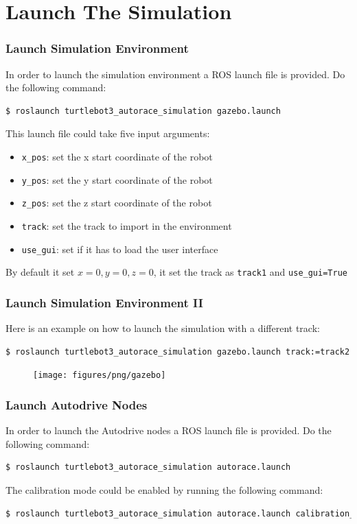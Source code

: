 \section{Launch The Simulation}

\begin{frame}[fragile]
	\frametitle{Launch Simulation Environment}
	In order to launch the simulation environment a ROS launch file is provided. Do the following command:
\begin{lstlisting}[language=bash]
$ roslaunch turtlebot3_autorace_simulation gazebo.launch
\end{lstlisting}

This launch file could take five input arguments:
\begin{itemize}
	\item \texttt{x\_pos}: set the x start coordinate of the robot
	\item \texttt{y\_pos}: set the y start coordinate of the robot
	\item \texttt{z\_pos}: set the z start coordinate of the robot
	\item \texttt{track}: set the track to import in the environment
	\item \texttt{use\_gui}: set if it has to load the user interface
\end{itemize}
By default it set $x = 0, y = 0, z = 0$, it set the track as \texttt{track1} and \texttt{use\_gui=True}
\end{frame}

\begin{frame}[fragile]
\frametitle{Launch Simulation Environment II}
Here is an example on how to launch the simulation with a different track:
\begin{lstlisting}[language=bash]
$ roslaunch turtlebot3_autorace_simulation gazebo.launch track:=track2
\end{lstlisting}
\begin{figure}
	\texttt{[image: figures/png/gazebo]}
\end{figure}
\end{frame}

\begin{frame}[fragile]
	\frametitle{Launch Autodrive Nodes}
	In order to launch the Autodrive nodes a ROS launch file is provided. Do the following command:
\begin{lstlisting}[language=bash]
$ roslaunch turtlebot3_autorace_simulation autorace.launch
\end{lstlisting}

The calibration mode could be enabled by running the following command:
\begin{lstlisting}[language=bash]
$ roslaunch turtlebot3_autorace_simulation autorace.launch calibration_mode:=calibration
\end{lstlisting}
\end{frame}

